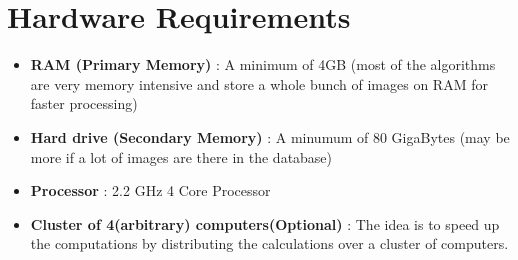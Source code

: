 \section{Hardware Requirements}
\begin{itemize}
\item \textbf{RAM (Primary Memory)} : A minimum of 4GB (most of the algorithms are very memory intensive and store a whole bunch of images on RAM for faster processing)
\item \textbf{Hard drive (Secondary Memory)} : A minumum of 80 GigaBytes (may be more if a lot of images are there in the database)
\item \textbf{Processor} : 2.2 GHz 4 Core Processor 
\item \textbf{Cluster of 4(arbitrary) computers(Optional)} : The idea is to speed up the computations by distributing the calculations over a cluster of computers.
\end{itemize}

